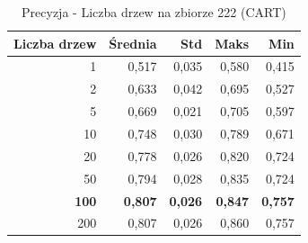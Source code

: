 \begin{table}[htbp]
\centering
\small
\setlength{\tabcolsep}{6pt}
\renewcommand{\arraystretch}{1.2}
\caption{Precyzja - Liczba drzew na zbiorze 222 (CART)}
\label{tab:CART_tree_count_222_precision}
\begin{tabular}{r|r|r|r|r}
\toprule
Liczba drzew & Średnia & Std & Maks & Min \\
\hline
1 & 0,517 & 0,035 & 0,580 & 0,415 \\
2 & 0,633 & 0,042 & 0,695 & 0,527 \\
5 & 0,669 & 0,021 & 0,705 & 0,597 \\
10 & 0,748 & 0,030 & 0,789 & 0,671 \\
20 & 0,778 & 0,026 & 0,820 & 0,724 \\
50 & 0,794 & 0,028 & 0,835 & 0,724 \\
\textbf{100} & \textbf{0,807} & \textbf{0,026} & \textbf{0,847} & \textbf{0,757} \\
200 & 0,807 & 0,026 & 0,860 & 0,757 \\
\bottomrule
\end{tabular}
\end{table}